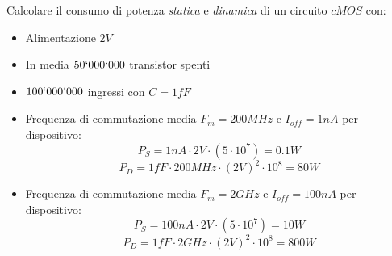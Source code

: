 \documentclass[12pt]{article}
\begin{document}
\begin{example}{}{}
    Calcolare il consumo di potenza \emph{statica} e \emph{dinamica} di un circuito $cMOS$ con:
    \begin{itemize}
        \item Alimentazione $2V$
        \item In media $50`000`000$ transistor spenti
        \item $100`000`000$ ingressi con $C=1fF$
    \end{itemize}
    \begin{itemize}
        \item[\boxed{C1}] Frequenza di commutazione media $F_m = 200MHz$ e $I_{off} = 1nA$ per dispositivo:
            \[ P_S = 1nA \cdot 2V \cdot (5 \cdot 10^7) = 0.1W \]
            \[ P_D = 1fF\cdot 200MHz\cdot (2V)^2\cdot 10^8 = 80W \]
        \item[\boxed{C2}] Frequenza di commutazione media $F_m = 2GHz$ e $I_{off} = 100nA$ per dispositivo:
            \[ P_S = 100nA \cdot 2V \cdot (5 \cdot 10^7) = 10W \]
            \[ P_D = 1fF\cdot 2GHz\cdot (2V)^2\cdot 10^8 = 800W \]
    \end{itemize}
\end{example}
\end{document}
